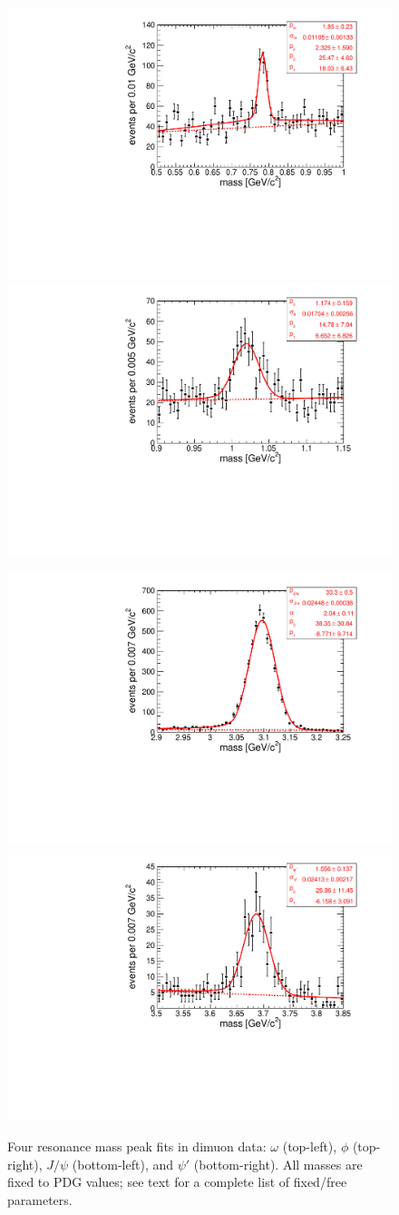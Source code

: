 \documentclass[12pt]{cms-tdr}
\begin{document}
\begin{figure}
\includegraphics[width=0.5\linewidth]{PLOTS/respeak_omega.pdf} \hfill
\includegraphics[width=0.5\linewidth]{PLOTS/respeak_phi.pdf}

\includegraphics[width=0.5\linewidth]{PLOTS/respeak_jpsi.pdf} \hfill
\includegraphics[width=0.5\linewidth]{PLOTS/respeak_psiprime.pdf}

\caption{Four resonance mass peak fits in dimuon data: $\omega$
  (top-left), $\phi$ (top-right), $J/\psi$ (bottom-left), and $\psi'$
  (bottom-right).  All masses are fixed to PDG values; see text for a
  complete list of fixed/free parameters. \label{fig:respeak_fits}}
\end{figure}
\end{document}
